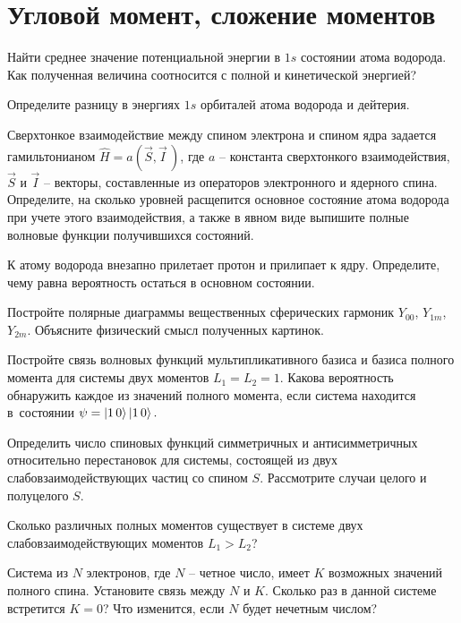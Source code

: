 \setmainfont{Noto Serif}
\setsansfont{Noto Sans}
\setmonofont{Noto Sans Mono}
\footnotesize

\section{Угловой момент, сложение моментов}

 Найти среднее значение потенциальной энергии в $1s$ состоянии атома водорода. Как полученная величина соотносится с полной и кинетической энергией?
\par
{} Определите разницу в энергиях $1s$ орбиталей атома водорода и дейтерия.
\par
{} Сверхтонкое взаимодействие между спином электрона и спином ядра задается гамильтонианом $\widehat H = a (\vec S, \vec I\,)$, где $a$ – константа сверхтонкого взаимодействия, $\vec S$ и $\vec I$ – векторы, составленные из операторов электронного и ядерного спина. Определите, на сколько уровней расщепится основное состояние атома водорода при учете этого взаимодействия, а также в явном виде выпишите полные волновые функции получившихся состояний.
\par
{} К атому водорода внезапно прилетает протон и прилипает к ядру. Определите, чему равна вероятность остаться в основном состоянии.
\par
{} Постройте полярные диаграммы вещественных сферических гармоник $\textit{Y}_{00}$, $\textit{Y}_{1m}$, $\textit{Y}_{2m}$. Объясните физический смысл полученных картинок.
\par
{} Постройте связь волновых функций мультипликативного базиса и базиса полного момента для системы двух моментов $L_1 = L_2 = 1$. Какова вероятность обнаружить каждое из значений полного момента, если система находится в~состоянии $\psi = \ket{1\,0}\ket{1\,0}.$
\par
{} Определить число спиновых функций симметричных и антисимметричных относительно перестановок для системы, состоящей из двух слабовзаимодействующих частиц со спином $S$. Рассмотрите случаи целого и полуцелого $S$.\par
{} Сколько различных полных моментов существует в системе двух слабовзаимодействующих моментов $L_1 > L_2$?
\par
{} Система из $N$ электронов, где $N$ – четное число, имеет $K$ возможных значений полного спина. Установите связь между $N$ и $K$. Сколько раз в данной системе встретится $K = 0$? Что изменится, если $N$ будет нечетным числом?
